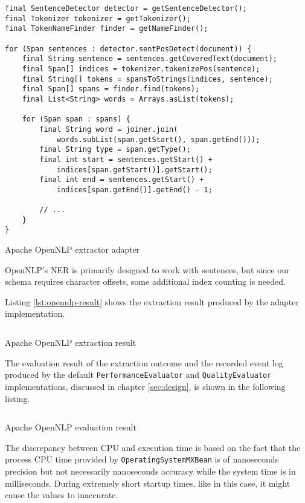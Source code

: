 \begin{listing}[H]
\begin{verbatim}
final SentenceDetector detector = getSentenceDetector();
final Tokenizer tokenizer = getTokenizer();
final TokenNameFinder finder = getNameFinder();

for (Span sentences : detector.sentPosDetect(document)) {
    final String sentence = sentences.getCoveredText(document);
    final Span[] indices = tokenizer.tokenizePos(sentence);
    final String[] tokens = spansToStrings(indices, sentence);
    final Span[] spans = finder.find(tokens);
    final List<String> words = Arrays.asList(tokens);

    for (Span span : spans) {
        final String word = joiner.join(
            words.subList(span.getStart(), span.getEnd()));
        final String type = span.getType();
        final int start = sentences.getStart() + 
            indices[span.getStart()].getStart();
        final int end = sentences.getStart() + 
            indices[span.getEnd()].getEnd() - 1;

        // ...
    }
}
\end{verbatim}
\caption{Apache OpenNLP extractor adapter}
\label{lst:opennlp-adapter}
\end{listing}

OpenNLP's \gls{NER} is primarily designed to work with sentences, but since our schema requires character offsets, some additional index counting is needed.

Listing \ref{lst:opennlp-result} shows the extraction result produced by the adapter implementation.

\begin{listing}[H]
\inputminted{xml}{opennlp.xml}
\caption{Apache OpenNLP extraction result}
\label{lst:opennlp-result}
\end{listing}

The evaluation result of the extraction outcome and the recorded event log produced by the default \texttt{PerformanceEvaluator} and \texttt{QualityEvaluator} implementations, discussed in chapter \ref{sec:design}, is shown in the following listing.

\begin{listing}[H]
\inputminted{java}{opennlp.txt}
\caption{Apache OpenNLP evaluation result}
\label{lst:opennlp-eval-result}
\end{listing}

The discrepancy between CPU and execution time is based on the fact that the process CPU time provided by \texttt{OperatingSystemMXBean} is of nanoseconds precision but not necessarily nanoseconds accuracy \cite{OperatingSystemMXBean} while the system time is in milliseconds. During extremely short startup times, like in this case, it might cause the values to inaccurate.

